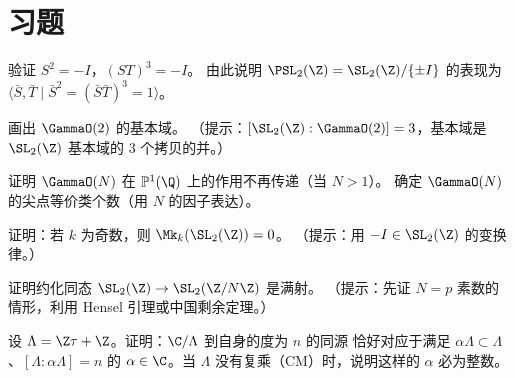 \section{习题}
\label{sec:ch1-exercises}

\begin{exercise}
\label{ex:ch1-sl2z-1}
验证 $S^2 = -I$，$(ST)^3 = -I$。
由此说明 $\PSL_2(\Z) = \SL_2(\Z)/\{\pm I\}$ 的表现为
$\langle \bar{S}, \bar{T} \mid \bar{S}^2 = (\bar{S}\bar{T})^3 = 1 \rangle$。
\end{exercise}

\begin{exercise}
\label{ex:ch1-fund-domain}
画出 $\GammaO(2)$ 的基本域。
（提示：$[\SL_2(\Z) : \GammaO(2)] = 3$，基本域是 $\SL_2(\Z)$ 基本域的
$3$ 个拷贝的并。）
\end{exercise}

\begin{exercise}
\label{ex:ch1-cusps-gamma0}
证明 $\GammaO(N)$ 在 $\mathbb{P}^1(\Q)$ 上的作用不再传递（当 $N > 1$）。
确定 $\GammaO(N)$ 的尖点等价类个数（用 $N$ 的因子表达）。
\end{exercise}

\begin{exercise}
\label{ex:ch1-weight-k}
证明：若 $k$ 为奇数，则 $\Mk_k(\SL_2(\Z)) = 0$。
（提示：用 $-I \in \SL_2(\Z)$ 的变换律。）
\end{exercise}

\begin{exercise}
\label{ex:ch1-surjection}
证明约化同态 $\SL_2(\Z) \to \SL_2(\Z/N\Z)$ 是满射。
（提示：先证 $N = p$ 素数的情形，利用 Hensel 引理或中国剩余定理。）
\end{exercise}

\begin{exercise}
\label{ex:ch1-isogeny-degree}
设 $\Lambda = \Z\tau + \Z$。证明：$\C/\Lambda$ 到自身的度为 $n$ 的同源
恰好对应于满足 $\alpha\Lambda \subset \Lambda$、$[\Lambda : \alpha\Lambda] = n$
的 $\alpha \in \C$。当 $\Lambda$ 没有复乘（CM）时，说明这样的 $\alpha$ 必为整数。
\end{exercise}
